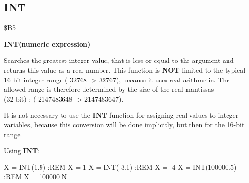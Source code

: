 \subsection{INT}
\begin{description}[leftmargin=3cm,style=nextline]
\item [Token:] \$B5
\item [Format:] {\bf INT(numeric expression)}
\item [Usage:] Searches the greatest
               integer value, that is less or equal to the argument
               and returns this value as a real number.
               This function is {\bf NOT} limited to the typical
               16-bit integer range (-32768 -> 32767), because
               it uses real arithmetic. The allowed range is
               therefore determined by the size of the real
               mantissas \\
               (32-bit) : (-2147483648 -> 2147483647).

\item [Remarks:] It is not necessary to use the {\bf INT}
               function for assigning real values to integer
               variables, because this conversion will be done
               implicitly, but then for the 16-bit range.

\item [Example:] Using {\bf INT}:
\begin{screenoutput}
 X  = INT(1.9)       :REM X = 1
 X  = INT(-3.1)      :REM X = -4
 X  = INT(100000.5)  :REM X = 100000
 N%
\end{screenoutput}
\end{description}


\newpage
